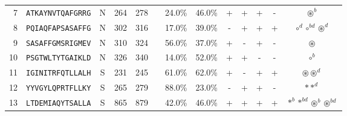 \begin{tabular}{rcccccccccccc}
7  &  \texttt{ATKAYNVTQAFGRRG} &       N &    264 &   278 &                                                                  &                          24.0\% &                           46.0\% &          + &           + &          + &           - &                                                                                     $ \circledast^b $ \\
8  &  \texttt{PQIAQFAPSASAFFG} &       N &    302 &   316 &                                                                  &                          17.0\% &                           39.0\% &          - &           + &          + &           + &                                                                  $ \circ^d \circ^{bd} \circledast^d $ \\
9  &  \texttt{SASAFFGMSRIGMEV} &       N &    310 &   324 &                                                                  &                          56.0\% &                           37.0\% &          + &           - &          + &           - &                                                                                       $ \circledast $ \\
10 &  \texttt{PSGTWLTYTGAIKLD} &       N &    326 &   340 &                                                                  &                          14.0\% &                           52.0\% &          + &           + &          - &           - &                                                                                           $ \circ^b $ \\
11 &  \texttt{IGINITRFQTLLALH} &       S &    231 &   245 &                                                                  &                          61.0\% &                           62.0\% &          + &           - &          + &           + &                                                                         $ \circledast \circledast^d $ \\
12 &  \texttt{YYVGYLQPRTFLLKY} &       S &    265 &   279 &                                                                  &                          88.0\% &                           23.0\% &          - &           + &          + &           - &                                                                                       $ \ast \ast^d $ \\
13 &  \texttt{LTDEMIAQYTSALLA} &       S &    865 &   879 &                                                                  &                          42.0\% &                           46.0\% &          + &           + &          + &           + &                                                   $ \ast^b \ast^{bd} \circledast^b \circledast^{bd} $ \\

\end{tabular}
